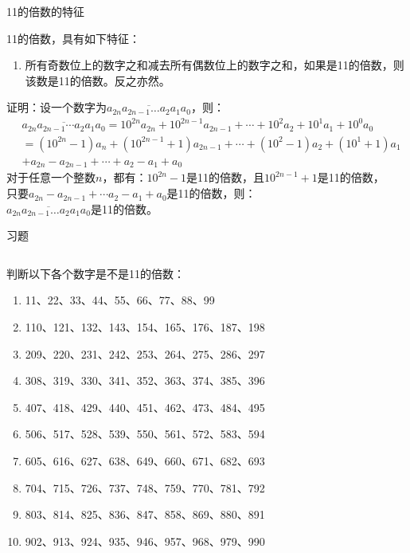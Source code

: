 \documentclass[aspectratio=169]{ctexbeamer} %
\date{\today}
\begin{document}
\begin{frame}[t]{11的倍数的特征}
\begin{spacing}{1.2}
\normalsize
11的倍数，具有如下特征：
\begin{enumerate}[label={\arabic*.}]
\item \alert{所有奇数位上的数字之和减去所有偶数位上的数字之和，如果是11的倍数，则该数是11的倍数。反之亦然。}
\end{enumerate}
证明：设一个数字为$\overline{a_{2n}a_{2n-1} \dots a_{2}a_{1}a_{0}}$，则：
\begin{align*}
&\overline{a_{2n}a_{2n-1} \cdots a_{2}a_{1}a_{0}} = 10^{2n}a_{2n} + 10^{2n-1}a_{2n-1} +\cdots +10^{2}a_{2}+ 10^{1}a_{1} + 10^0a_{0} \\
&=(10^{2n}-1)a_{n} + (10^{2n-1}+1)a_{2n-1}+ \cdots +(10^{2}-1)a_{2}+ (10^{1}+1)a_{1} \\
&+ a_{2n} - a_{2n-1} +\cdots + a_{2} - a_{1} + a_{0} 
\end{align*}
对于任意一个整数$n$，都有：$10^{2n}-1$是11的倍数，且$10^{2n-1}+1$是11的倍数， \\
只要$a_{2n} -  a_{2n-1} +\cdots a_{2} - a_{1} + a_{0}$是11的倍数，则：\\
$\overline{a_{2n}a_{2n-1} \dots a_{2}a_{1}a_{0}}$是11的倍数。
\end{spacing}
\end{frame}

\begin{frame}[t]{习题}
\begin{columns}
\begin{spacing}{1.2}
\normalsize
判断以下各个数字是不是11的倍数：
\begin{enumerate}[label={\arabic*.}]
\item 11、22、33、44、55、66、77、88、99
\item 110、121、132、143、154、165、176、187、198
\item 209、220、231、242、253、264、275、286、297
\item 308、319、330、341、352、363、374、385、396
\item 407、418、429、440、451、462、473、484、495
\item 506、517、528、539、550、561、572、583、594
\item 605、616、627、638、649、660、671、682、693
\item 704、715、726、737、748、759、770、781、792
\item 803、814、825、836、847、858、869、880、891
\item 902、913、924、935、946、957、968、979、990
\end{enumerate}
\end{spacing}
\end{columns}
\end{frame}
\end{document}
